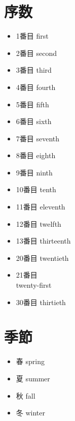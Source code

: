 \documentclass[10pt]{jsarticle}
\newcommand{\answer}[2]{{\color{orange}#2}}
\newcommand{\answer}[2]{\vspace{#1mm}}
\begin{document}
\newpage

\section{序数}
\begin{screen}
  \begin{multicols}{4}
    \begin{itemize}
      \item 1番目 \answer{5}{first}
      \item 2番目 \answer{5}{second}
      \item 3番目 \answer{5}{third}
      \item 4番目 \answer{5}{fourth}
      \item 5番目 \answer{5}{fifth}
      \item 6番目 \answer{5}{sixth}
      \item 7番目 \answer{5}{seventh}
      \item 8番目 \answer{5}{eighth}
      \item 9番目 \answer{5}{ninth}
      \item 10番目 \answer{5}{tenth}
      \item 11番目 \answer{5}{eleventh}
      \item 12番目 \answer{5}{twelfth}
      \item 13番目 \answer{5}{thirteenth}
      \item 20番目 \answer{5}{twentieth\\}
      \item 21番目 \answer{5}{\\twenty-first}
      \item 30番目 \answer{5}{thirtieth}
    \end{itemize}
  \end{multicols}
\end{screen}

\section{季節}
\begin{screen}
  \begin{multicols}{4}
    \begin{itemize}
      \item 春 \answer{5}{spring}
      \item 夏 \answer{5}{summer}
      \item 秋 \answer{5}{fall}
      \item 冬 \answer{5}{winter}
    \end{itemize}
  \end{multicols}
\end{screen}
\end{document}
